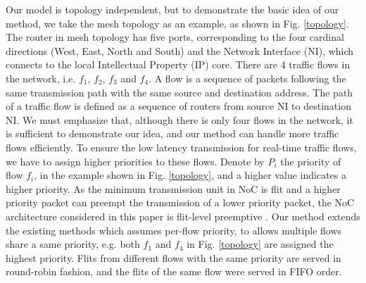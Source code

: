\documentclass[10pt,journal]{IEEEtran}
\begin{document}
Our model is topology independent, but to demonstrate the basic idea of our method, we take the mesh topology as an example, as shown in Fig. \ref{topology}. The router in mesh topology has five ports, corresponding to the four cardinal directions (West, East, North and South) and the Network Interface (NI), which connects to the local Intellectual Property (IP) core. There are 4 traffic flows in the network, i.e. $f_1$, $f_2$, $f_3$ and $f_4$. A flow is a sequence of packets following the same transmission path with the same source and destination address. The path of a traffic flow is defined as a sequence of routers from source NI to destination NI. We must emphasize that, although there is only four flows in the network, it is sufficient to demonstrate our idea, and our method can handle more traffic flows efficiently. To ensure the low latency transmission for real-time traffic flows, we have to assign higher priorities to these flows. Denote by $P_i$ the priority of flow $f_i$, in the example shown in Fig. \ref{topology}, and a higher value indicates a higher priority. As the minimum transmission unit in NoC is flit and a higher priority packet can preempt the transmission of a lower priority packet, the NoC architecture considered in this paper is flit-level preemptive \cite{Lee:2003:RWC:846077.846083}. Our method extends the existing methods \cite{73}\cite{Qian489900} which assumes per-flow priority, to allows multiple flows share a same priority, e.g. both $f_1$ and $f_4$ in Fig. \ref{topology} are assigned the highest priority. Flits from different flows with the same priority are served in round-robin fashion, and the flits of the same flow were served in FIFO order.
\end{document}
